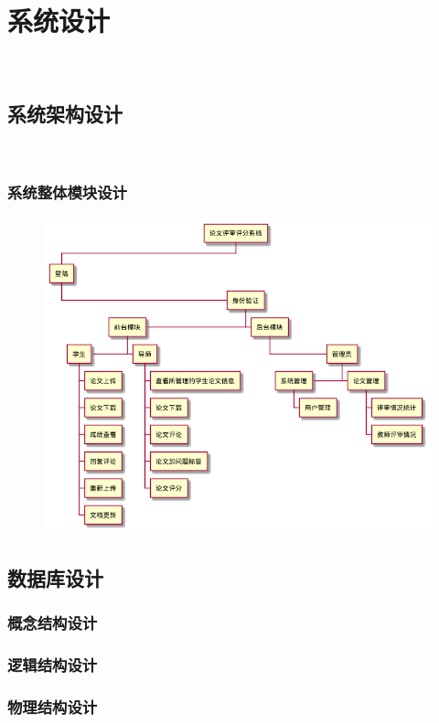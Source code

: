 
\chapter{系统设计}
\label{chap07}
~\\
\section{系统架构设计}
~\\
\subsection{系统整体模块设计}

\begin{figure}[h]
	\centering
	\includegraphics[scale = 0.6]{out/uml/WBS/系统WBS/系统WBS.png}
	\caption{\song\wuhao }
\end{figure}

\section{数据库设计}
\subsection{概念结构设计}
\subsection{逻辑结构设计}
\subsection{物理结构设计}

